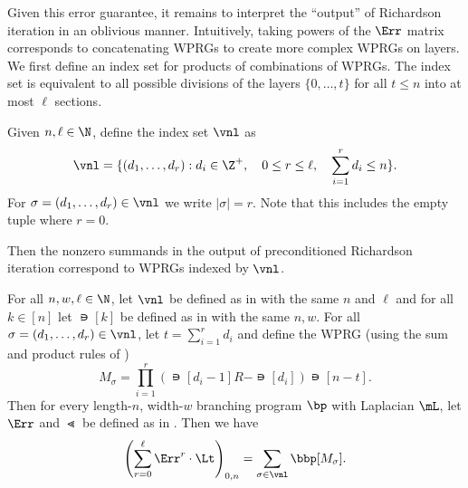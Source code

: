 Given this error guarantee, it remains to interpret the ``output'' of Richardson iteration in an oblivious manner. Intuitively, taking powers of the $\Err$ matrix corresponds to concatenating WPRGs to create more complex WPRGs on layers. We first define an index set for products of combinations of WPRGs. The index set is equivalent to all possible divisions of the layers $\{0,\ldots,t\}$ for all $t\leq n$ into at most $\ell$ sections.
\begin{definition}\label{def:pathIndex}
Given $n,\ell \in \N$, define the index set $\vnl$ as
\[\vnl = \{(d_1,\dots, d_r) : d_i\in \Z^+, \quad 0\leq r\leq \ell,\quad \sum_{i=1}^rd_i\leq n\}.\]
For $\sigma=(d_1,\dots,d_r) \in \vnl$ we write $|\sigma|=r$. Note that this includes the empty tuple where $r=0$.
\end{definition}
Then the nonzero summands in the output of preconditioned %
Richardson  %
iteration correspond to WPRGs indexed by $\vnl$.
\begin{lemma}\label{lem:richardSummandsPath}
For all $n,w,\ell \in \N$, let $\vnl$ be defined as in  with the same $n$ and $\ell$ and for all $k\in[n]$ let $\nis[k]$ be defined as in  with the same $n,w$. For all $\sigma=(d_1,\dots,d_r) \in \vnl$, let $t=\sum_{i=1}^rd_i$ and define the WPRG (using the sum and product rules of 
%
 )  %
\[M_\sigma = \prod_{i=1}^r\left(\nis[d_i-1]R-\nis[d_i]\right)\nis[n-t].\]
Then for every length-$n$, width-$w$ branching program $\bp$ with Laplacian $\mL$, let $\Err$ and $\Lt$ be defined as in . Then we have
\[\left(\sum_{r=0}^\ell\Err^r\cdot \Lt\right)_{0,n} = \sum_{\sigma \in \vnl}\bbp[M_\sigma].\]
\end{lemma}
